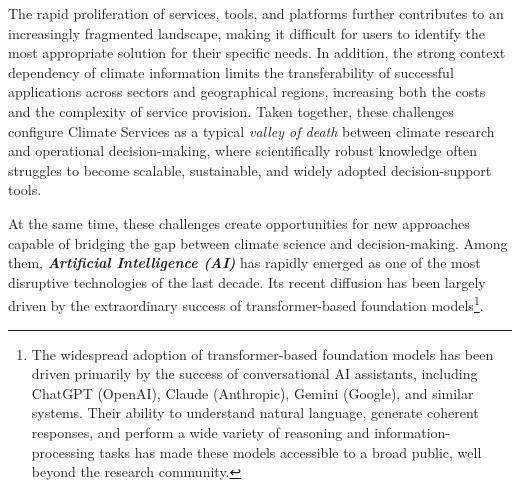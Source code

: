 The rapid proliferation of services, tools, and platforms further contributes to an increasingly fragmented landscape, making it difficult for users to identify the most appropriate solution for their specific needs. In addition, the strong context dependency of climate information limits the transferability of successful applications across sectors and geographical regions, increasing both the costs and the complexity of service provision. 
Taken together, these challenges configure Climate Services as a typical \textit{valley of death} between climate research and operational decision-making, where scientifically robust knowledge often struggles to become scalable, sustainable, and widely adopted decision-support tools.


At the same time, these challenges create opportunities for new approaches capable of bridging the gap between climate science and decision-making. Among them, \textbf{\textit{Artificial Intelligence (AI)}} has rapidly emerged as one of the most disruptive technologies of the last decade. Its recent diffusion has been largely driven by the extraordinary success of transformer-based foundation models\footnote{The widespread adoption of transformer-based foundation models has been driven primarily by the success of conversational AI assistants, including ChatGPT (OpenAI), Claude (Anthropic), Gemini (Google), and similar systems. Their ability to understand natural language, generate coherent responses, and perform a wide variety of reasoning and information-processing tasks has made these models accessible to a broad public, well beyond the research community.}.

